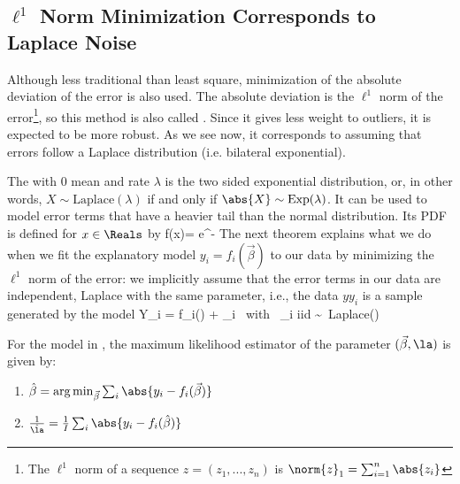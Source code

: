 

\subsection{$\ell^1$ Norm
Minimization Corresponds to Laplace Noise}

Although less traditional than least square,
minimization of the absolute deviation of the
error is also used. The absolute deviation is the
$\ell^1$ norm of the error\footnote{The $\ell^1$
norm of a sequence $z=(z_1,...,z_n)$ is
$\norm{z}_1=\sum_{i=1}^n \abs{z_i}$}, so this
method is also called . Since it gives less weight to
outliers, it is expected to be more robust. As we
see now, it corresponds to assuming that errors
follow a Laplace distribution (i.e. bilateral
exponential).

The \label{def-laplace}
with $0$ mean and rate $\lambda$ is the two sided
exponential distribution, or, in other words, $X
\sim \mbox{
 Laplace}(\lambda)$ if and only if $\abs{X}\sim \mbox{Exp}(\lambda)$.
It can be used to model error terms that have a heavier tail
 than the normal distribution. Its PDF is defined for $x \in
 \Reals$ by
 \be
 f(x)= e^{-\lambda{}}
 \ee
%
The next theorem explains what we do when we fit
the explanatory model $y_i= f_i(\vec{\beta})$ to
our data by minimizing the $\ell^1$ norm of the
error: we implicitly assume that the error terms
in our data are independent, Laplace with the
same parameter, i.e., the data $yy_i$ is a sample
generated by the model
\be
 Y_i = f_i(\vec{\beta}) + \eps_i \mbox{ with } \eps_i \mbox{iid} \sim \mbox{
 Laplace}(\lambda) \label{eq:ld-mod}
 \ee
\begin{shadethm} For the model in ,
the maximum likelihood estimator of the parameter
$(\vec{\beta},\la)$ is given by:\begin{enumerate}
    \item
$\hat{\beta}  = \arg\min_{\vec{\beta}} \sum_{i} \abs{y_i -
f_i(\vec{\beta})}$
    \item
$\frac{1}{\hat{\la}}=\frac{1}{I}\sum_i\abs{y_i
-f_i(\hat{\beta})}$
\end{enumerate}
%
 \label{theo-ladlls}
\end{shadethm}

